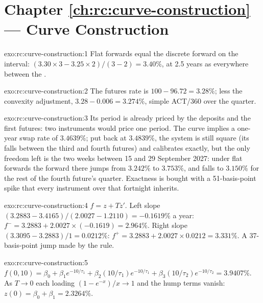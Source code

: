 \section*{Chapter \ref{ch:rc:curve-construction} --- Curve Construction}

\begin{solution}{exo:rc:curve-construction:1}
Flat forwards equal the discrete forward on the interval: $(3.30\times3 -
3.25\times2)/(3-2) = 3.40\%$, at 2.5 years as everywhere between the .
\end{solution}

\begin{solution}{exo:rc:curve-construction:2}
The futures rate is $100-96.72 = 3.28\%$; less the convexity adjustment,
$3.28-0.006 = 3.274\%$, simple ACT/360 over the quarter.
\end{solution}

\begin{solution}{exo:rc:curve-construction:3}
Its period is already priced by the deposits and the first futures: two
instruments would price one period. The curve implies a one-year swap rate of
$3.4639\%$; put back at $3.4839\%$, the system is still square (its 
falls between the third and fourth futures) and calibrates exactly, but the
only freedom left is the two weeks between 15 and 29 September 2027: under
flat forwards the forward there jumps from $3.242\%$ to $3.753\%$, and falls
to $3.150\%$ for the rest of the fourth future's quarter. Exactness is bought
with a 51-basis-point spike that every instrument over that fortnight inherits.
\end{solution}

\begin{solution}{exo:rc:curve-construction:4}
$f = z + Tz'$. Left slope $(3.2883-3.4165)/(2.0027-1.2110) = -0.1619\%$ a year:
$f^- = 3.2883 + 2.0027\times(-0.1619) = 2.964\%$. Right slope
$(3.3095-3.2883)/1 = 0.0212\%$: $f^+ = 3.2883+2.0027\times0.0212 = 3.331\%$. A
37-basis-point jump made by the rule.
\end{solution}

\begin{solution}{exo:rc:curve-construction:5}
$f(0,10) = \beta_0 + \beta_1e^{-10/\tau_1} + \beta_2(10/\tau_1)e^{-10/\tau_1} +
\beta_3(10/\tau_2)e^{-10/\tau_2} = 3.9407\%$. As $T\to0$ each loading
$(1-e^{-x})/x\to1$ and the hump terms vanish: $z(0)=\beta_0+\beta_1 =
2.3264\%$.
\end{solution}

